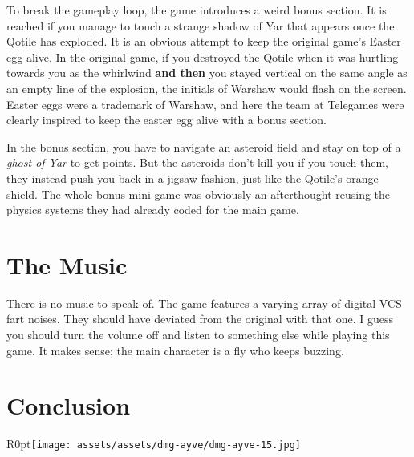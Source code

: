 \documentclass{book}
\begin{document}
\FloatBarrier\vspace{\baselineskip}\centering
\begin{minipage}{0.45\linewidth}\end{minipage}\vspace{2pt}
\begin{minipage}{0.45\linewidth}\end{minipage}
\par\justifying
To break the gameplay loop, the game introduces a weird bonus section. It is reached if you manage to touch a strange shadow of Yar that appears once the Qotile has exploded. It is an obvious attempt to keep the original game’s Easter egg alive. In the original game, if you destroyed the Qotile when it was hurtling towards you as the whirlwind \textbf{and then} you stayed vertical on the same angle as an empty line of the explosion, the initials of Warshaw would flash on the screen. Easter eggs were a trademark of Warshaw, and here the team at Telegames were clearly inspired to keep the easter egg alive with a bonus section.\par
In the bonus section, you have to navigate an asteroid field and stay on top of a \emph{ghost of Yar} to get points. But the asteroids don’t kill you if you touch them, they instead push you back in a jigsaw fashion, just like the Qotile’s orange shield. The whole bonus mini game was obviously an afterthought reusing the physics systems they had already coded for the main game.\par
\FloatBarrier\section*{The Music}
There is no music to speak of. The game features a varying array of digital VCS fart noises. They should have deviated from the original with that one. I guess you should turn the volume off and listen to something else while playing this game. It makes sense; the main character is a fly who keeps buzzing.\par
\FloatBarrier\section*{Conclusion}
\begin{wrapfigure}{R}{0pt}{\texttt{[image: assets/assets/dmg-ayve/dmg-ayve-15.jpg]}}\end{wrapfigure}
\end{document}
